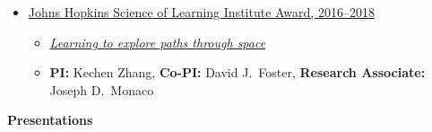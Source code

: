 \documentclass[10pt]{article}
\begin{document}
\begin{itemize}
\begin{itemize}
\end{itemize}

\item \href{http://scienceoflearning.jhu.edu/research/learning-to-explore-paths-through-space/}{Johns Hopkins Science of Learning Institute Award, 2016--2018}

\begin{itemize}
\item \href{http://scienceoflearning.jhu.edu/research/learning-to-explore-paths-through-space/}{\emph{Learning to explore paths through space}}

\item \textbf{PI:} Kechen Zhang, \textbf{Co-PI:} David J.~Foster, \textbf{Research Associate:} Joseph D.~Monaco

\end{itemize}

\end{itemize}

{\large \textbf{Presentations}}
\end{document}
